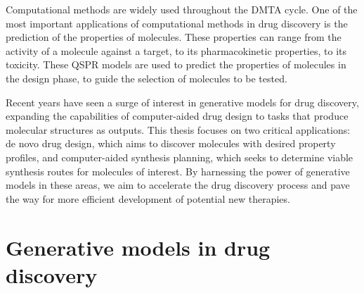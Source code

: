 Computational methods are widely used throughout the DMTA cycle. One of the most important
applications of computational methods in drug discovery is the prediction of the properties of
molecules. These properties can range from the activity of a molecule against a target, to its
pharmacokinetic properties, to its toxicity. These \ac{QSPR} models are used to predict the
properties of molecules in the design phase, to guide the selection of molecules to be tested.

Recent years have seen a surge of interest in generative models for drug discovery, expanding the
capabilities of computer-aided drug design to tasks that produce molecular structures as outputs.
This thesis focuses on two critical applications: de novo drug design, which aims to discover
molecules with desired property profiles, and computer-aided synthesis planning, which seeks to
determine viable synthesis routes for molecules of interest. By harnessing the power of generative
models in these areas, we aim to accelerate the drug discovery process and pave the way for more
efficient development of potential new therapies.

\section{Generative models in drug discovery}
